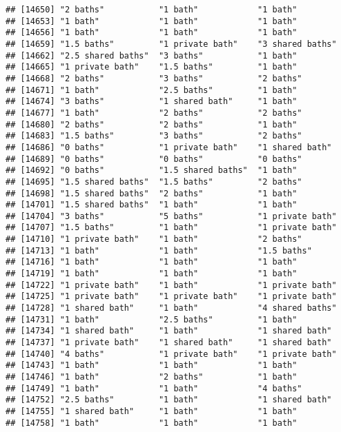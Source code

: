 \documentclass[
]{article}
\begin{document}
\begin{verbatim}
## [14650] "2 baths"           "1 bath"            "1 bath"           
## [14653] "1 bath"            "1 bath"            "1 bath"           
## [14656] "1 bath"            "1 bath"            "1 bath"           
## [14659] "1.5 baths"         "1 private bath"    "3 shared baths"   
## [14662] "2.5 shared baths"  "3 baths"           "1 bath"           
## [14665] "1 private bath"    "1.5 baths"         "1 bath"           
## [14668] "2 baths"           "3 baths"           "2 baths"          
## [14671] "1 bath"            "2.5 baths"         "1 bath"           
## [14674] "3 baths"           "1 shared bath"     "1 bath"           
## [14677] "1 bath"            "2 baths"           "2 baths"          
## [14680] "2 baths"           "2 baths"           "1 bath"           
## [14683] "1.5 baths"         "3 baths"           "2 baths"          
## [14686] "0 baths"           "1 private bath"    "1 shared bath"    
## [14689] "0 baths"           "0 baths"           "0 baths"          
## [14692] "0 baths"           "1.5 shared baths"  "1 bath"           
## [14695] "1.5 shared baths"  "1.5 baths"         "2 baths"          
## [14698] "1.5 shared baths"  "2 baths"           "1 bath"           
## [14701] "1.5 shared baths"  "1 bath"            "1 bath"           
## [14704] "3 baths"           "5 baths"           "1 private bath"   
## [14707] "1.5 baths"         "1 bath"            "1 private bath"   
## [14710] "1 private bath"    "1 bath"            "2 baths"          
## [14713] "1 bath"            "1 bath"            "1.5 baths"        
## [14716] "1 bath"            "1 bath"            "1 bath"           
## [14719] "1 bath"            "1 bath"            "1 bath"           
## [14722] "1 private bath"    "1 bath"            "1 private bath"   
## [14725] "1 private bath"    "1 private bath"    "1 private bath"   
## [14728] "1 shared bath"     "1 bath"            "4 shared baths"   
## [14731] "1 bath"            "2.5 baths"         "1 bath"           
## [14734] "1 shared bath"     "1 bath"            "1 shared bath"    
## [14737] "1 private bath"    "1 shared bath"     "1 shared bath"    
## [14740] "4 baths"           "1 private bath"    "1 private bath"   
## [14743] "1 bath"            "1 bath"            "1 bath"           
## [14746] "1 bath"            "2 baths"           "1 bath"           
## [14749] "1 bath"            "1 bath"            "4 baths"          
## [14752] "2.5 baths"         "1 bath"            "1 shared bath"    
## [14755] "1 shared bath"     "1 bath"            "1 bath"           
## [14758] "1 bath"            "1 bath"            "1 bath"           

\end{verbatim}
\end{document}
